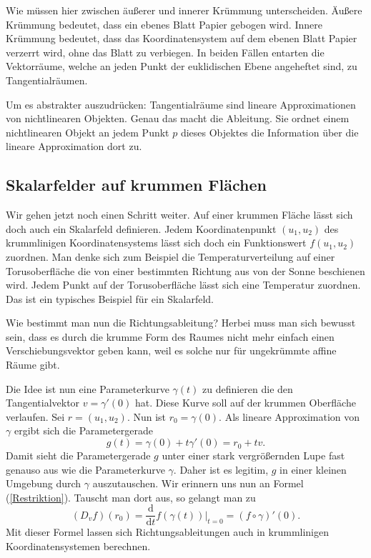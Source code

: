 \documentclass[a4paper,12pt,fleqn]{article}
\begin{document}
Wie müssen hier zwischen äußerer und innerer Krümmung unterscheiden.
Äußere Krümmung bedeutet, dass ein ebenes Blatt Papier gebogen
wird. Innere Krümmung bedeutet, dass das Koordinatensystem auf
dem ebenen Blatt Papier verzerrt wird, ohne das Blatt zu verbiegen.
In beiden Fällen entarten die Vektorräume, welche an jeden Punkt
der euklidischen Ebene angeheftet sind, zu Tangentialräumen.

Um es abstrakter auszudrücken: Tangentialräume sind lineare
Approximationen von nichtlinearen Objekten. Genau das macht
die Ableitung. Sie ordnet einem nichtlinearen Objekt an jedem
Punkt $p$ dieses Objektes die Information über die lineare
Approximation dort zu.

\subsection{Skalarfelder auf krummen Flächen}

Wir gehen jetzt noch einen Schritt weiter.
Auf einer krummen Fläche lässt sich doch auch ein
Skalarfeld definieren. Jedem Koordinatenpunkt $(u_1,u_2)$
des krummlinigen Koordinatensystems lässt sich doch
ein Funktionswert $f(u_1,u_2)$ zuordnen. Man denke sich zum Beispiel
die Temperaturverteilung auf einer Torusoberfläche die von einer
bestimmten Richtung aus von der Sonne beschienen wird. Jedem Punkt
auf der Torusoberfläche lässt sich eine Temperatur zuordnen.
Das ist ein typisches Beispiel für ein Skalarfeld.

Wie bestimmt man nun die Richtungsableitung? Herbei muss man sich
bewusst sein, dass es durch die krumme Form des Raumes nicht mehr
einfach einen Verschiebungsvektor geben kann, weil es solche nur für
ungekrümmte affine Räume gibt.

Die Idee ist nun eine Parameterkurve $\gamma(t)$ zu definieren die den
Tangentialvektor $v=\gamma'(0)$ hat. Diese Kurve soll auf der
krummen Oberfläche verlaufen. Sei $r=(u_1,u_2)$. Nun ist
$r_0=\gamma(0)$. Als lineare Approximation von $\gamma$ ergibt
sich die Parametergerade
\begin{equation}
g(t) = \gamma(0)+t\gamma'(0) = r_0+tv.
\end{equation}
Damit sieht die Parametergerade $g$ unter einer stark vergrößernden
Lupe fast genauso aus wie die Parameterkurve $\gamma$. Daher
ist es legitim, $g$ in einer kleinen Umgebung durch $\gamma$
auszutauschen. Wir erinnern uns nun an Formel (\ref{Restriktion}).
Tauscht man dort aus, so gelangt man zu
\begin{equation}\label{via-gamma}
(D_v f)(r_0) = \frac{\mathrm d}{\mathrm dt}f(\gamma(t))\Big|_{t=0}
= (f\circ\gamma)'(0).
\end{equation}
Mit dieser Formel lassen sich Richtungsableitungen auch
in krummlinigen Koordinatensystemen berechnen.
\end{document}
